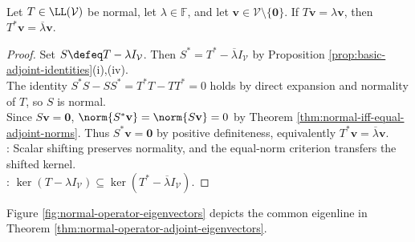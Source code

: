 \begin{theorem} \label{thm:normal-operator-adjoint-eigenvectors} \\
Let $T\in\LL(\mathcal{V})$ be normal, let $\lambda\in\mathbb{F}$, and let $\mathbf{v}\in\mathcal{V}\setminus\{\mathbf{0}\}$. If $T\mathbf{v}=\lambda\mathbf{v}$, then $T^*\mathbf{v}=\overline{\lambda}\mathbf{v}$.
\begin{proof}
Set $S\defeq T-\lambda I_{\mathcal{V}}$. Then $S^*=T^*-\overline{\lambda}I_{\mathcal{V}}$ by Proposition \ref{prop:basic-adjoint-identities}(i),(iv).\\
The identity $S^*S-SS^*=T^*T-TT^*=0$ holds by direct expansion and normality of $T$, so $S$ is normal.\\
Since $S\mathbf{v}=\mathbf{0}$, $\norm{S^*\mathbf{v}}=\norm{S\mathbf{v}}=0$ by Theorem \ref{thm:normal-iff-equal-adjoint-norms}. Thus $S^*\mathbf{v}=\mathbf{0}$ by positive definiteness, equivalently $T^*\mathbf{v}=\overline{\lambda}\mathbf{v}$.\\
: Scalar shifting preserves normality, and the equal-norm criterion transfers the shifted kernel.\\
: $\ker(T-\lambda I_{\mathcal{V}})\subseteq\ker(T^*-\overline{\lambda}I_{\mathcal{V}})$.
\end{proof}
\end{theorem}

Figure \ref{fig:normal-operator-eigenvectors} depicts the common eigenline in Theorem \ref{thm:normal-operator-adjoint-eigenvectors}.

\begin{illustrationfigure}[H]
  \centering
  
  \caption{A normal operator and its adjoint preserve the same eigenline with conjugate eigenvalues.}
  \label{fig:normal-operator-eigenvectors}
\end{illustrationfigure}

